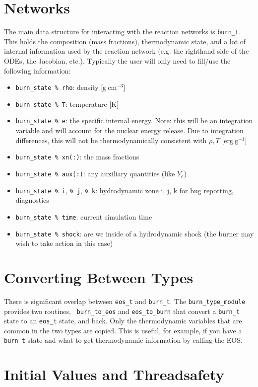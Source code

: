 \section{Networks}

The main data structure for interacting with the reaction networks is
{\tt burn\_t}.  This holds the composition (mass fractions),
thermodynamic state, and a lot of internal information used by the
reaction network (e.g. the righthand side of the ODEs, the Jacobian,
etc.).  Typically the user will only need to fill/use the following
information:
\begin{itemize}
\item {\tt burn\_state \% rho}: density [$\mathrm{g~cm^{-3}}$]

\item {\tt burn\_state \% T}: temperature [K]

\item {\tt burn\_state \% e}: the specific internal energy.  Note: this
  will be an integration variable and will account for the nuclear
  energy release.  Due to integration differences, this will not be
  thermodynamically consistent with $\rho, T$  [$\mathrm{erg~g^{-1}}$]

\item {\tt burn\_state \% xn(:)}: the mass fractions

\item {\tt burn\_state \% aux(:)}: any auxiliary quantities (like $Y_e$)

\item {\tt burn\_state \% i}, {\tt \% j}, {\tt \% k}: hydrodynamic zone i, j, k for
  bug reporting, diagnostics

\item {\tt burn\_state \% time}: current simulation time

\item {\tt burn\_state \% shock}: are we inside of a hydrodynamic shock (the burner
  may wish to take action in this case)

\end{itemize}






\section{Converting Between Types}

There is significant overlap between {\tt eos\_t} and {\tt burn\_t}.
The {\tt burn\_type\_module} provides two routines, {\tt
  burn\_to\_eos} and {\tt eos\_to\_burn} that convert a {\tt burn\_t}
state to an {\tt eos\_t} state, and back.  Only the thermodynamic
variables that are common in the two types are copied.  This is
useful, for example, if you have a {\tt burn\_t} state and what to get
thermodynamic information by calling the EOS.


\section{Initial Values and Threadsafety}

